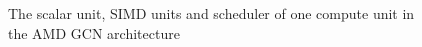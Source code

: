\begin{figure}
\begin{center}
\end{center}
\caption{The scalar unit, SIMD units and scheduler of one compute unit in the AMD GCN architecture}
\label{fig:gpu-scalar}
\end{figure}
